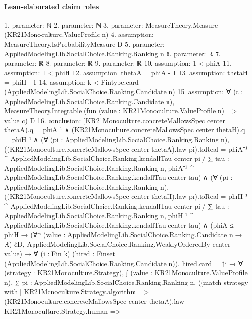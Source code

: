 \documentclass[10pt]{article}
\begin{document}
\paragraph{Lean-elaborated claim roles}\begin{ReviewVerbatim}
1. parameter: ℕ
2. parameter: ℕ
3. parameter: MeasureTheory.Measure (KR21Monoculture.ValueProfile n)
4. assumption: MeasureTheory.IsProbabilityMeasure D
5. parameter: AppliedModelingLib.SocialChoice.Ranking.Ranking n
6. parameter: ℝ
7. parameter: ℝ
8. parameter: ℝ
9. parameter: ℝ
10. assumption: 1 < phiA
11. assumption: 1 < phiH
12. assumption: thetaA = phiA - 1
13. assumption: thetaH = phiH - 1
14. assumption: k < Fintype.card (AppliedModelingLib.SocialChoice.Ranking.Candidate n)
15. assumption: ∀ (c : AppliedModelingLib.SocialChoice.Ranking.Candidate n),
  MeasureTheory.Integrable (fun (value : KR21Monoculture.ValueProfile n) => value c) D
16. conclusion: (KR21Monoculture.concreteMallowsSpec center thetaA).q = phiA⁻¹ ∧
  (KR21Monoculture.concreteMallowsSpec center thetaH).q = phiH⁻¹ ∧
    (∀ (pi : AppliedModelingLib.SocialChoice.Ranking.Ranking n),
        ((KR21Monoculture.concreteMallowsSpec center thetaA).law pi).toReal =
          phiA⁻¹ ^ AppliedModelingLib.SocialChoice.Ranking.kendallTau center pi /
            ∑ tau : AppliedModelingLib.SocialChoice.Ranking.Ranking n,
              phiA⁻¹ ^ AppliedModelingLib.SocialChoice.Ranking.kendallTau center tau) ∧
      (∀ (pi : AppliedModelingLib.SocialChoice.Ranking.Ranking n),
          ((KR21Monoculture.concreteMallowsSpec center thetaH).law pi).toReal =
            phiH⁻¹ ^ AppliedModelingLib.SocialChoice.Ranking.kendallTau center pi /
              ∑ tau : AppliedModelingLib.SocialChoice.Ranking.Ranking n,
                phiH⁻¹ ^ AppliedModelingLib.SocialChoice.Ranking.kendallTau center tau) ∧
        (phiA ≤ phiH →
            (∀ᵐ (value : AppliedModelingLib.SocialChoice.Ranking.Candidate n → ℝ) ∂D,
                AppliedModelingLib.SocialChoice.Ranking.WeaklyOrderedBy center value) →
              ∀ (i : Fin k) (hired : Finset (AppliedModelingLib.SocialChoice.Ranking.Candidate n)),
                hired.card = ↑i →
                  ∀ (strategy : KR21Monoculture.Strategy),
                    ∫ (value : KR21Monoculture.ValueProfile n),
                        ∑ pi : AppliedModelingLib.SocialChoice.Ranking.Ranking n,
                          ((match strategy with
                                | KR21Monoculture.Strategy.algorithm =>
                                  (KR21Monoculture.concreteMallowsSpec center thetaA).law
                                | KR21Monoculture.Strategy.human =>

\end{ReviewVerbatim}
\end{document}
